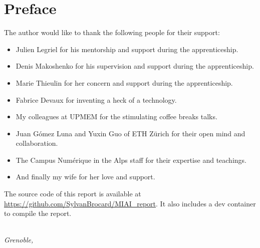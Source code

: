 \chapter*{Preface}

The author would like to thank the following people for their support:
\begin{itemize}
    \item Julien Legriel for his mentorship and support during the apprenticeship.
    \item Denis Makoshenko for his supervision and support during the apprenticeship.
    \item Marie Thieulin for her concern and support during the apprenticeship.
    \item Fabrice Devaux for inventing a heck of a technology.
    \item My colleagues at UPMEM for the stimulating coffee breaks talks.
    \item Juan Gómez Luna and Yuxin Guo of ETH Zürich for their open mind and collaboration.
    \item The Campus Numérique in the Alps staff for their expertise and teachings.
    \item And finally my wife for her love and support.
\end{itemize}

The source code of this report is available at \url{https://github.com/SylvanBrocard/MIAI_report}. It also includes a dev container to compile the report.

\begin{flushright}
{\makeatletter\itshape
    \@author \\
    Grenoble, \monthname{} \the\year{}
\makeatother}
\end{flushright}
